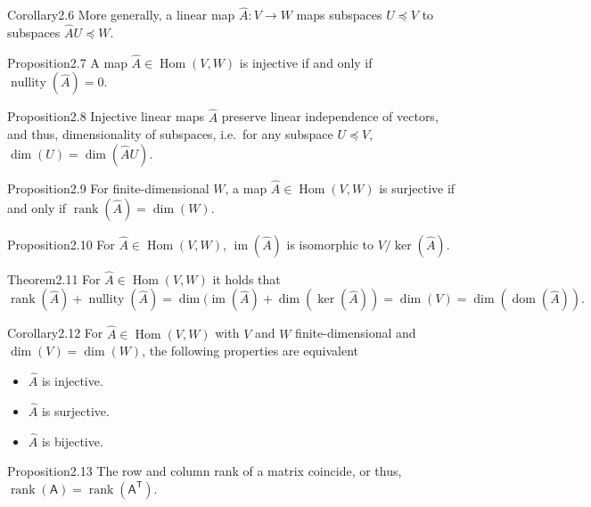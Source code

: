 \begin{res}{Corollary}{2.6}
More generally, a linear map $\hat A:V\to W$ maps subspaces $U\preccurlyeq V$ to subspaces $\hat AU\preccurlyeq W$.
\end{res}

\begin{res}{Proposition}{2.7}
A map $\hat A\in\operatorname{Hom}(V,W)$ is injective if and only if $\operatorname{nullity}(\hat A)=0$.
\end{res}

\begin{res}{Proposition}{2.8}
Injective linear maps $\hat A$ preserve linear independence of vectors, and thus, dimensionality of subspaces, i.e.\ for any subspace $U\preccurlyeq V$, $\dim(U)=\dim(\hat AU)$.
\end{res}

\begin{res}{Proposition}{2.9}
For finite-dimensional $W$, a map $\hat A\in\operatorname{Hom}(V,W)$ is surjective if and only if $\operatorname{rank}(\hat A)=\dim(W)$.
\end{res}

\begin{res}{Proposition}{2.10}
For $\hat A\in\operatorname{Hom}(V,W)$, $\operatorname{im}(\hat A)$ is isomorphic to $V/\ker(\hat A)$.
\end{res}

\begin{res}{Theorem}{2.11}
For $\hat A\in\operatorname{Hom}(V,W)$ it holds that
\[\operatorname{rank}(\hat A)+\operatorname{nullity}(\hat A)=\dim(\operatorname{im}(\hat A)+\dim(\ker(\hat A))=\dim(V)=\dim(\operatorname{dom}(\hat A)).\]
\end{res}

\begin{res}{Corollary}{2.12}
For $\hat A\in\operatorname{Hom}(V,W)$ with $V$ and $W$ finite-dimensional and $\dim(V)=\dim(W)$, the following properties are equivalent
\begin{itemize}
\item $\hat A$ is injective.
\item $\hat A$ is surjective.
\item $\hat A$ is bijective.
\end{itemize}
\end{res}

\begin{res}{Proposition}{2.13}
The row and column rank of a matrix coincide, or thus, $\operatorname{rank}(\mathsf A)=\operatorname{rank}(\mathsf A^{\mathsf T})$.
\end{res}

